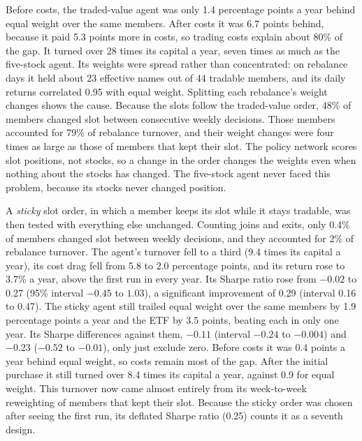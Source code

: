 Before costs, the traded-value agent was only 1.4 percentage points a year behind equal weight over
the same members. After costs it was 6.7 points behind, because it paid 5.3 points more in costs, so trading
costs explain about 80\% of the gap. It turned over 28 times its capital a year, seven times as much
as the five-stock agent. Its weights were spread rather than concentrated: on rebalance days it held
about 23 effective names out of 44 tradable members, and its daily returns correlated 0.95 with equal
weight. Splitting each rebalance's weight changes shows the cause. Because the slots follow the
traded-value order, 48\% of members changed slot between consecutive weekly decisions. Those members
accounted for 79\% of rebalance turnover, and their weight changes were four times as large as those
of members that kept their slot. The policy network scores slot positions, not stocks, so a change in
the order changes the weights even when nothing about the stocks has changed. The five-stock agent never
faced this problem, because its stocks never changed position.

A \emph{sticky} slot order, in which a member keeps its slot while it stays tradable, was then tested
with everything else unchanged. Counting joins and exits, only 0.4\% of members changed slot between
weekly decisions, and they accounted for 2\% of rebalance turnover. The agent's turnover fell to a
third (9.4 times its capital a year), its cost drag fell from 5.8 to 2.0 percentage points, and its
return rose to 3.7\% a year, above the first run in every year. Its Sharpe ratio rose from $-0.02$ to
0.27 (95\% interval $-0.45$ to $1.03$), a significant improvement of 0.29 (interval 0.16 to 0.47).
The sticky agent still trailed equal weight over the same members by 1.9 percentage points a year and
the ETF by 3.5 points, beating each in only one year. Its Sharpe differences against them, $-0.11$
(interval $-0.24$ to $-0.004$) and $-0.23$ ($-0.52$ to $-0.01$), only just exclude zero. Before costs
it was 0.4 points a year behind equal weight, so costs remain most of the gap. After the initial
purchase it still turned over 8.4 times its capital a year, against 0.9 for equal weight. This
turnover now came almost entirely from its week-to-week reweighting of members that kept their slot.
Because the sticky order was chosen after seeing the first run, its deflated Sharpe ratio (0.25)
counts it as a seventh design.

